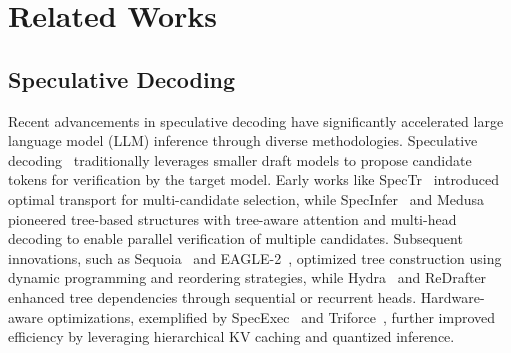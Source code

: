 \section{Related Works}
\subsection{Speculative Decoding}
\label{app:sd}

Recent advancements in speculative decoding have significantly accelerated large language model (LLM) inference through diverse methodologies. Speculative decoding~\citep{sd1,sd2} traditionally leverages smaller draft models to propose candidate tokens for verification by the target model. Early works like SpecTr~\citep{spectr} introduced optimal transport for multi-candidate selection, while SpecInfer~\citep{specinfer} and Medusa~\citep{medusa} pioneered tree-based structures with tree-aware attention and multi-head decoding to enable parallel verification of multiple candidates. Subsequent innovations, such as Sequoia~\citep{sequoia} and EAGLE-2~\citep{eagle2}, optimized tree construction using dynamic programming and reordering strategies, while Hydra~\citep{hydra} and ReDrafter~\citep{redrafter} enhanced tree dependencies through sequential or recurrent heads. Hardware-aware optimizations, exemplified by SpecExec~\citep{specexec} and Triforce~\citep{triforce}, further improved efficiency by leveraging hierarchical KV caching and quantized inference.  

